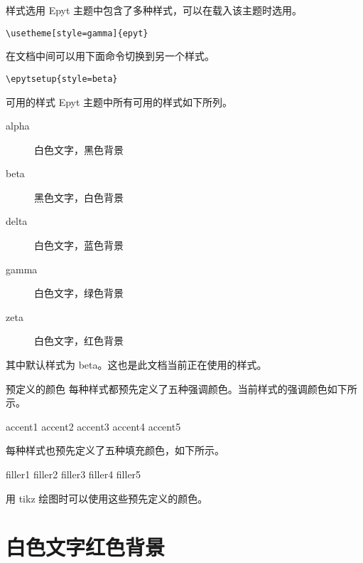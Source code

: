 \documentclass[14pt,notheorems,xcolor={rgb}]{beamer}
\newcommand{\mylead}[1]{\textcolor{accent1}{#1}}
\newcommand{\mybold}[1]{\textcolor{accent2}{#1}}
\begin{document}
\begin{frame}[fragile]{样式选用}
\mylead{Epyt} 主题中包含了多种样式，可以在载入该主题时选用。
\begin{lstlisting}
\usetheme[style=gamma]{epyt}
\end{lstlisting}
\pause 在文档中间可以用下面命令切换到另一个样式。
\begin{lstlisting}
\epytsetup{style=beta}
\end{lstlisting}
\end{frame}

\begin{frame}{可用的样式}
\mylead{Epyt} 主题中所有可用的样式如下所列。
\begin{description}
  \item[alpha] 白色文字，黑色背景
  \item[beta]  黑色文字，白色背景
  \item[delta] 白色文字，蓝色背景
  \item[gamma] 白色文字，绿色背景
  \item[zeta]  白色文字，红色背景
\end{description}
\pause
其中默认样式为 \mybold{beta}。这也是此文档当前正在使用的样式。
\end{frame}

\begin{frame}{预定义的颜色}
每种样式都预先定义了五种强调颜色。当前样式的强调颜色如下所示。
\begin{flushleft}
\textcolor{accent1}{accent1}
\textcolor{accent2}{accent2}
\textcolor{accent3}{accent3}
\textcolor{accent4}{accent4}
\textcolor{accent5}{accent5}
\end{flushleft}
\pause 每种样式也预先定义了五种填充颜色，如下所示。
\begin{flushleft}
\colorbox{filler1}{filler1}
\colorbox{filler2}{filler2}
\colorbox{filler3}{filler3}
\colorbox{filler4}{filler4}
\colorbox{filler5}{filler5}
\end{flushleft}
\pause 用 tikz 绘图时可以使用这些预先定义的颜色。
\end{frame}


\begin{frame}[plain]\transboxout
\titlepage
\end{frame}

\section{白色文字红色背景}
\end{document}
